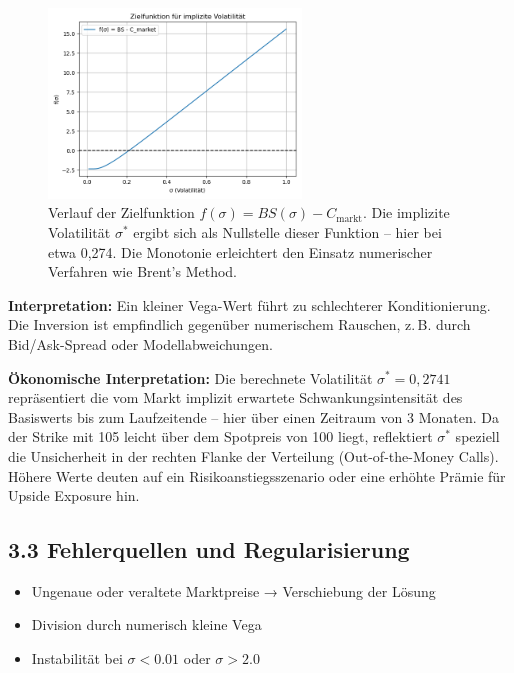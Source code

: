 \documentclass[a4paper,12pt]{article}
\begin{document}
\begin{figure}[h]
  \centering
  \includegraphics[width=0.6\textwidth]{iv_root_example.png}
  \caption{Verlauf der Zielfunktion \( f(\sigma) = BS(\sigma) - C_{\text{markt}} \). Die implizite Volatilität \( \sigma^* \) ergibt sich als Nullstelle dieser Funktion – hier bei etwa 0{,}274. Die Monotonie erleichtert den Einsatz numerischer Verfahren wie Brent's Method.}
\end{figure}

\textbf{Interpretation:}  
Ein kleiner Vega-Wert führt zu schlechterer Konditionierung. Die Inversion ist empfindlich gegenüber numerischem Rauschen, z.\,B. durch Bid/Ask-Spread oder Modellabweichungen.

\textbf{Ökonomische Interpretation:}  
Die berechnete Volatilität \(\sigma^* = 0{,}2741\) repräsentiert die vom Markt implizit erwartete Schwankungsintensität des Basiswerts bis zum Laufzeitende – hier über einen Zeitraum von 3 Monaten. Da der Strike mit 105 leicht über dem Spotpreis von 100 liegt, reflektiert \(\sigma^*\) speziell die Unsicherheit in der rechten Flanke der Verteilung (Out-of-the-Money Calls). Höhere Werte deuten auf ein Risikoanstiegsszenario oder eine erhöhte Prämie für Upside Exposure hin.



\subsection*{3.3 Fehlerquellen und Regularisierung}

\begin{itemize}
  \item Ungenaue oder veraltete Marktpreise → Verschiebung der Lösung
  \item Division durch numerisch kleine Vega
  \item Instabilität bei $\sigma < 0.01$ oder $\sigma > 2.0$
\end{itemize}
\end{document}
